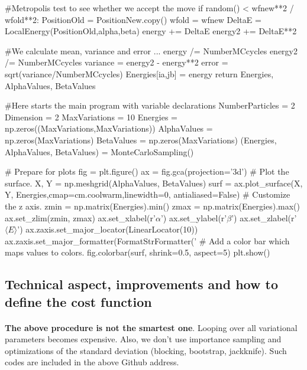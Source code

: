 \documentclass[%
oneside,                 %
final,                   %
10pt]{article}
\begin{document}
                #Metropolis test to see whether we accept the move
                if random() < wfnew**2 / wfold**2:
                   PositionOld = PositionNew.copy()
                   wfold = wfnew
                   DeltaE = LocalEnergy(PositionOld,alpha,beta)
                energy += DeltaE
                energy2 += DeltaE**2

            #We calculate mean, variance and error ...
            energy /= NumberMCcycles
            energy2 /= NumberMCcycles
            variance = energy2 - energy**2
            error = sqrt(variance/NumberMCcycles)
            Energies[ia,jb] = energy    
    return Energies, AlphaValues, BetaValues


#Here starts the main program with variable declarations
NumberParticles = 2
Dimension = 2
MaxVariations = 10
Energies = np.zeros((MaxVariations,MaxVariations))
AlphaValues = np.zeros(MaxVariations)
BetaValues = np.zeros(MaxVariations)
(Energies, AlphaValues, BetaValues) = MonteCarloSampling()

# Prepare for plots
fig = plt.figure()
ax = fig.gca(projection='3d')
# Plot the surface.
X, Y = np.meshgrid(AlphaValues, BetaValues)
surf = ax.plot_surface(X, Y, Energies,cmap=cm.coolwarm,linewidth=0, antialiased=False)
# Customize the z axis.
zmin = np.matrix(Energies).min()
zmax = np.matrix(Energies).max()
ax.set_zlim(zmin, zmax)
ax.set_xlabel(r'$\alpha$')
ax.set_ylabel(r'$\beta$')
ax.set_zlabel(r'$\langle E \rangle$')
ax.zaxis.set_major_locator(LinearLocator(10))
ax.zaxis.set_major_formatter(FormatStrFormatter('%
# Add a color bar which maps values to colors.
fig.colorbar(surf, shrink=0.5, aspect=5)
plt.show()

\epycod


\subsection{Technical aspect, improvements and how to define the cost function}

\paragraph{}

\textbf{The above procedure is not the smartest one}. Looping over all variational parameters becomes expensive.
Also, we don't use importance sampling and optimizations of the standard deviation (blocking, bootstrap, jackknife). 
Such codes are included in the above Github address.
\end{document}
